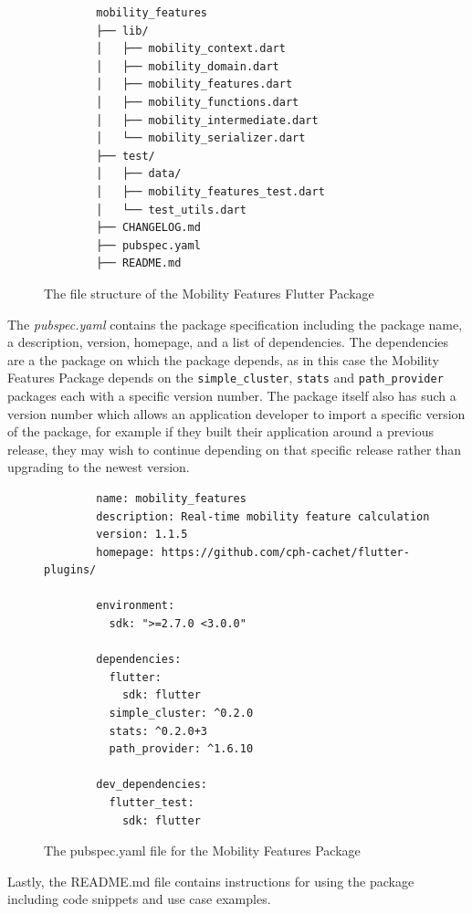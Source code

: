 \begin{figure}
    \centering
    \begin{verbatim}
        mobility_features
        ├── lib/
        │   ├── mobility_context.dart
        │   ├── mobility_domain.dart
        │   ├── mobility_features.dart
        │   ├── mobility_functions.dart
        │   ├── mobility_intermediate.dart
        │   └── mobility_serializer.dart
        ├── test/
        │   ├── data/
        │   ├── mobility_features_test.dart
        │   └── test_utils.dart
        ├── CHANGELOG.md
        ├── pubspec.yaml
        ├── README.md
    \end{verbatim}
    \caption{The file structure of the Mobility Features Flutter Package}
    \label{fig:package-structure}
\end{figure}

The \textit{pubspec.yaml} contains the package specification including the package name, a description, version, homepage, and a list of dependencies. The dependencies are a the package on which the package depends, as in this case the Mobility Features Package depends on the \verb|simple_cluster|, \verb|stats| and \verb|path_provider| packages each with a specific version number. The package itself also has such a version number which allows an application developer to import a specific version of the package, for example if they built their application around a previous release, they may wish to continue depending on that specific release rather than upgrading to the newest version.

\begin{figure}
    \centering
    \begin{verbatim}
        name: mobility_features
        description: Real-time mobility feature calculation
        version: 1.1.5
        homepage: https://github.com/cph-cachet/flutter-plugins/
        
        environment:
          sdk: ">=2.7.0 <3.0.0"
        
        dependencies:
          flutter:
            sdk: flutter
          simple_cluster: ^0.2.0
          stats: ^0.2.0+3
          path_provider: ^1.6.10
        
        dev_dependencies:
          flutter_test:
            sdk: flutter
    \end{verbatim}
    \caption{The pubspec.yaml file for the Mobility Features Package}
    \label{fig:pubspec}
\end{figure}

Lastly, the README.md file contains instructions for using the package including code snippets and use case examples. 

